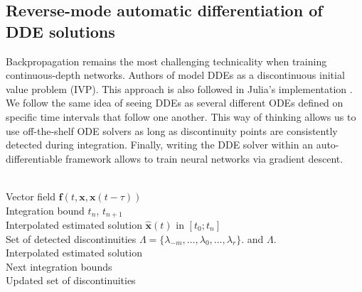 \subsection{Reverse-mode automatic differentiation of DDE solutions}
Backpropagation remains the most challenging technicality when training continuous-depth networks. Authors of \citet{numerical_dde} model DDEs as a discontinuous initial value problem (IVP). This approach is also followed in Julia's implementation \citep{julia_dde}. We follow the same idea of seeing DDEs as several different ODEs defined on specific time intervals that follow one another. This way of thinking allows us to use off-the-shelf ODE solvers as long as discontinuity points are consistently detected during integration. Finally, writing the DDE solver within an auto-differentiable framework allows to train neural networks via gradient descent.

\begin{algorithm}[H]
   \caption{Pseudo code for one DDE numerical integration step}
   \label{alg:one_step}
\begin{algorithmic}
    \\ Vector field $\mathbf{f}(t,\mathbf{x}, \mathbf{x}(t-\tau))$ \\ Integration bound $t_n$, $t_{n+1}$ \\ Interpolated estimated solution $\hat{\mathbf{x}}(t)$ in $[t_0;t_{n}]$ \\ Set of detected discontinuities $\Lambda = \{\lambda_{-m}, \dots, \lambda_0 , \dots, \lambda_r \}$. 
    \ENDWHILE
   \ELSE 
   \ENDIF 
    and $\Lambda$.
   \ELSE 
    \ELSE
   \ENDIF
   \ENDIF
    \\ Interpolated estimated solution \\ Next integration bounds \\ Updated set of discontinuities
\end{algorithmic}
\label{al:agl1}
\end{algorithm}


